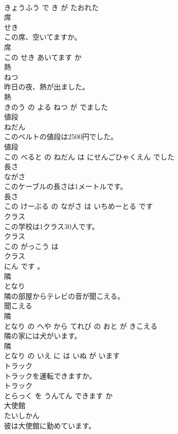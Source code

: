 \documentclass[8pt]{extreport}
\begin{document}
\begin{CJK}{UTF8}{min}
\\	きょうふう で き が たおれた			
\\	席	
\\	せき			
\\	この席、空いてますか。	
\\	席 
\\	この せき あいてます か			
\\	熱	
\\	ねつ			
\\	昨日の夜、熱が出ました。	
\\	熱 
\\	きのう の よる ねつ が でました			
\\	値段	
\\	ねだん			
\\	このベルトの値段は2500円でした。	
\\	値段 
\\	この べると の ねだん は にせんごひゃくえん でした			
\\	長さ	
\\	ながさ			
\\	このケーブルの長さは1メートルです。	
\\	長さ 
\\	この けーぶる の ながさ は いちめーとる です			
\\	クラス	
\\	この学校は1クラス30人です。	
\\	クラス 
\\	この がっこう は 
\\	クラス 
\\	にん です 。			
\\	隣	
\\	となり			
\\	隣の部屋からテレビの音が聞こえる。	
\\	聞こえる 
\\	隣 
\\	となり の へや から てれび の おと が きこえる			
\\	隣の家には犬がいます。	
\\	隣 
\\	となり の いえ に は いぬ が います			
\\	トラック	
\\	トラックを運転できますか。	
\\	トラック 
\\	とらっく を うんてん できます か			
\\	大使館	
\\	たいしかん			
\\	彼は大使館に勤めています。	

\end{CJK}
\end{document}
